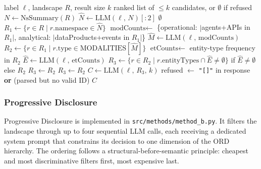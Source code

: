 \begin{algorithm}[!t]\small
  \caption{Progressive Disclosure (\texttt{src/methods/method\_b.py})}
  \label{alg:method-b}
  \begin{algorithmic}[1]
  \REQUIRE label $\ell$, landscape $R$, result size $k$
  \ENSURE ranked list of $\le k$ candidates, or $\emptyset$ if refused
  \STATE $N \leftarrow \mathrm{NsSummary}(R)$ 
  \STATE $\hat{N} \leftarrow \mathrm{LLM}(\ell,\, N)[:2]$ 
   \RETURN $\emptyset$ \ENDIF
  \STATE $R_1 \leftarrow \{r \in R \mid r.\text{namespace} \in \hat{N}\}$
  \STATE $\text{modCounts} \leftarrow$ \{operational: $|$agents+APIs in $R_1|$, analytical: $|$dataProducts+events in $R_1|$\}
  \STATE $\hat{M} \leftarrow \mathrm{LLM}(\ell,\, \text{modCounts})$ 
  \STATE $R_2 \leftarrow \{r \in R_1 \mid r.\text{type} \in \mathrm{MODALITIES}[\hat{M}]\}$
    \STATE $\text{etCounts} \leftarrow$ entity-type frequency in $R_2$ 
    \STATE $\hat{E} \leftarrow \mathrm{LLM}(\ell,\, \text{etCounts})$ 
    \STATE $R_3 \leftarrow \{r \in R_2 \mid r.\text{entityTypes} \cap \hat{E} \neq \emptyset\}$ if $\hat{E} \neq \emptyset$ else $R_2$
     \STATE $R_3 \leftarrow R_2$  \ENDIF
  \ELSE
    \STATE $R_3 \leftarrow R_2$ 
  \ENDIF
  \STATE $C \leftarrow \mathrm{LLM}(\ell,\, R_3,\, k)$ 
  \STATE refused $\leftarrow$ \texttt{"[]"} in response \textbf{or} (parsed but no valid ID)
  \RETURN $C$ 
  \end{algorithmic}
  \end{algorithm}%

\subsubsection{Progressive Disclosure}

Progressive Disclosure is implemented in \texttt{src/methods/method\_b.py}. It filters the landscape through up to four sequential LLM calls, each receiving a dedicated system prompt that constrains its decision to one dimension of the ORD hierarchy. The ordering follows a structural-before-semantic principle: cheapest and most discriminative filters first, most expensive last.

